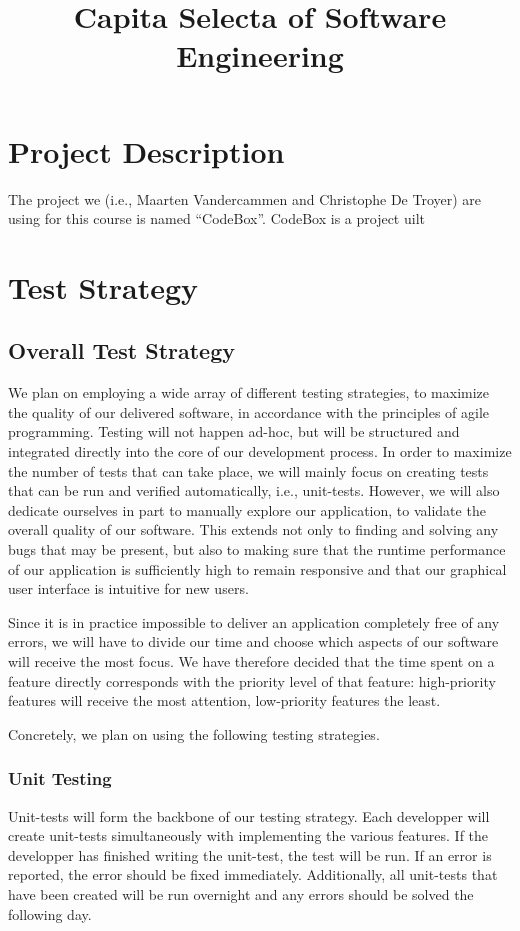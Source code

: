 \documentclass {article}
\title {Capita Selecta of Software Engineering}
\begin{document}
\maketitle
\section{Project Description}
The project we (i.e., Maarten Vandercammen and Christophe De Troyer) are using
for this course is named ``CodeBox''. CodeBox is a project uilt
\section{Test Strategy}

\subsection{Overall Test Strategy}
We plan on employing a wide array of different testing strategies, to maximize
the quality of our delivered software, in accordance with the principles of
agile programming. Testing will not happen ad-hoc, but will be structured and
integrated directly into the core of our development process.  In order to
maximize the number of tests that can take place, we will mainly focus on
creating tests that can be run and verified automatically, i.e., unit-tests.
However, we will also dedicate ourselves in part to manually explore our
application, to validate the overall quality of our software. This extends not
only to finding and solving any bugs that may be present, but also to making
sure that the runtime performance of our application is sufficiently high to
remain responsive and that our graphical user interface is intuitive for new
users.

Since it is in practice impossible to deliver an application completely free of
any errors, we will have to divide our time and choose which aspects of our
software will receive the most focus. We have therefore decided that the time
spent on a feature directly corresponds with the priority level of that feature:
high-priority features will receive the most attention, low-priority features
the least.

Concretely, we plan on using the following testing strategies.

\subsubsection*{Unit Testing}
Unit-tests will form the backbone of our testing strategy. Each developper will
create unit-tests simultaneously with implementing the various features.  If the
developper has finished writing the unit-test, the test will be run. If an error
is reported, the error should be fixed immediately.  Additionally, all
unit-tests that have been created will be run overnight and any errors should be
solved the following day.
\end{document}
